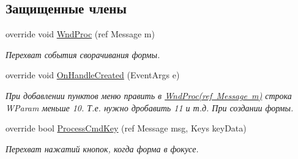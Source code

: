 \subsection*{Защищенные члены}
\begin{DoxyCompactItemize}
\item 
override void \mbox{\hyperlink{class_f_b_a_1_1_form_obj_a5ffeb2c6d68fb5211cf41aef5b4d4e27}{Wnd\+Proc}} (ref Message m)
\begin{DoxyCompactList}\small\item\em Перехват события сворачивания формы. \end{DoxyCompactList}\item 
override void \mbox{\hyperlink{class_f_b_a_1_1_form_obj_abc70df0d5f5e20245f4903505a559042}{On\+Handle\+Created}} (Event\+Args e)
\begin{DoxyCompactList}\small\item\em При добавлении пунктов меню править в \mbox{\hyperlink{class_f_b_a_1_1_form_obj_a5ffeb2c6d68fb5211cf41aef5b4d4e27}{Wnd\+Proc(ref Message m)}} строка W\+Param меньше 10. Т.\+е. нужно дробавить 11 и т.\+д. При создании формы. \end{DoxyCompactList}\item 
override bool \mbox{\hyperlink{class_f_b_a_1_1_form_obj_a8f82e90fc53f3040c7a0460d8fa83465}{Process\+Cmd\+Key}} (ref Message msg, Keys key\+Data)
\begin{DoxyCompactList}\small\item\em Перехват нажатий кнопок, когда форма в фокусе. \end{DoxyCompactList}\end{DoxyCompactItemize}
